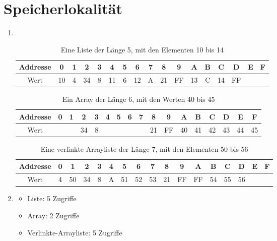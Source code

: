 \documentclass[DIN, pagenumber=false, fontsize=11pt, parskip=half]{scrartcl}
\begin{document}
    \section{Speicherlokalität}
    \begin{enumerate}[label=(\alph*)]
        \item $ $
            \begin{table}[H]
                \centering
                \begin{tabular}{ccccccccccccccccc} 
                    \toprule
                    Addresse & 0 & 1 & 2 & 3 & 4 & 5 & 6 & 7 & 8 & 9 & A & B & C & D & E & F\\
                    \midrule
                    Wert & 10 & 4 & 34 & 8 & 11 & 6 & 12 & A  & 21 & FF & 13 & C & 14 & FF \\
                    \bottomrule
                \end{tabular}
                \caption{Eine Liste der Länge 5, mit den Elementen 10 bis 14}
            \end{table}
            \begin{table}[H]
                \centering
                \begin{tabular}{ccccccccccccccccc} 
                    \toprule
                    Addresse & 0 & 1 & 2 & 3 & 4 & 5 & 6 & 7 & 8 & 9 & A & B & C & D & E & F\\
                    \midrule
                    Wert &  & & 34 & 8 & & & & & 21 & FF & 40 & 41 & 42 & 43 & 44 & 45\\
                    \bottomrule
                \end{tabular}
                \caption{Ein Array der Länge 6, mit den Werten 40 bis 45}
            \end{table}
            \begin{table}[H]
                \centering
                \begin{tabular}{ccccccccccccccccc} 
                    \toprule
                    Addresse & 0 & 1 & 2 & 3 & 4 & 5 & 6 & 7 & 8 & 9 & A & B & C & D & E & F\\
                    \midrule
                    Wert & 4  &  50 & 34 & 8 & A & 51 & 52& 53 & 21 & FF & FF & 54 & 55 & 56 \\
                    \bottomrule
                \end{tabular}
                \caption{Eine verlinkte Arrayliste der Länge 7, mit den Elementen 50 bis 56}
            \end{table}
        \item
            \begin{itemize}
                \item Liste: 5 Zugriffe
                \item Array: 2 Zugriffe
                \item Verlinkte-Arrayliste: 5 Zugriffe
            \end{itemize}
    \end{enumerate}
\end{document}
